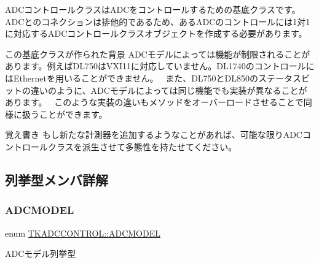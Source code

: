 A\+D\+Cコントロールクラスは\+A\+D\+Cをコントロールするための基底クラスです。~\newline
 A\+D\+Cとのコネクションは排他的であるため、ある\+A\+D\+Cのコントロールには1対1に対応する\+A\+D\+Cコントロールクラスオブジェクトを作成する必要があります。~\newline
 \begin{DoxyParagraph}{この基底クラスが作られた背景}
A\+D\+Cモデルによっては機能が制限されることがあります。例えば\+D\+L750は\+V\+X\+I11に対応していません。\+D\+L1740のコントロールには\+Ethernetを用いることができません。~\newline
 また、\+D\+L750と\+D\+L850のステータスビットの違いのように、\+A\+D\+Cモデルによっては同じ機能でも実装が異なることがあります。~\newline
 このような実装の違いもメソッドをオーバーロードさせることで同様に扱うことができます。~\newline
 
\end{DoxyParagraph}
\begin{DoxyNote}{覚え書き}
もし新たな計測器を追加するようなことがあれば、可能な限り\+A\+D\+Cコントロールクラスを派生させて多態性を持たせてください。 
\end{DoxyNote}


\subsection{列挙型メンバ詳解}
\mbox{\label{class_t_k_a_d_c_c_o_n_t_r_o_l_a9a5cfed6c86912f4b9053c8707cf89dd}} 
\subsubsection{\texorpdfstring{A\+D\+C\+M\+O\+D\+EL}{ADCMODEL}}
{\footnotesize\ttfamily enum \hyperlink{class_t_k_a_d_c_c_o_n_t_r_o_l_a9a5cfed6c86912f4b9053c8707cf89dd}{T\+K\+A\+D\+C\+C\+O\+N\+T\+R\+O\+L\+::\+A\+D\+C\+M\+O\+D\+EL}\hspace{0.3cm}{\ttfamily [strong]}}

A\+D\+Cモデル列挙型


